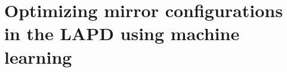 \graphicspath{{Chapters/Chapter_isat-predict/}}

\chapter{Optimizing mirror configurations in the LAPD using machine learning}
\label{ch:opt_ML}

%
%
%
%
%
%
%
%
%
%



